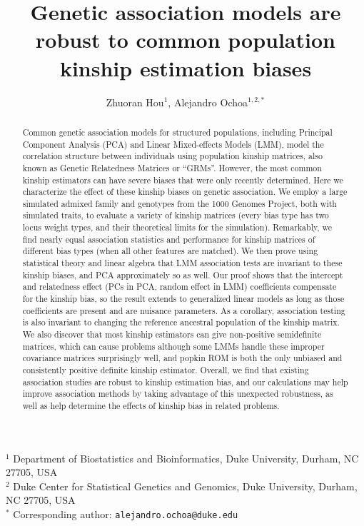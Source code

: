\documentclass[11pt]{article}
\title{\Large \textbf{Genetic association models are robust to common population kinship estimation biases}}
\author{Zhuoran Hou$^1$, Alejandro Ochoa$^{1,2,*}$}
\date{}
\begin{document}
\maketitle

\noindent
$^1$ Department of Biostatistics and Bioinformatics, Duke University, Durham, NC 27705, USA \\
$^2$ Duke Center for Statistical Genetics and Genomics, Duke University, Durham, NC 27705, USA \\
$^*$ Corresponding author: \texttt{alejandro.ochoa@duke.edu}


\begin{abstract}
  Common genetic association models for structured populations, including Principal Component Analysis (PCA) and Linear Mixed-effects Models (LMM), model the correlation structure between individuals using population kinship matrices, also known as Genetic Relatedness Matrices or ``GRMs''.
  However, the most common kinship estimators can have severe biases that were only recently determined.
  Here we characterize the effect of these kinship biases on genetic association.
  We employ a large simulated admixed family and genotypes from the 1000 Genomes Project, both with simulated traits, to evaluate a variety of kinship matrices (every bias type has two locus weight types, and their theoretical limits for the simulation).
  Remarkably, we find nearly equal association statistics and performance for kinship matrices of different bias types (when all other features are matched).
  We then prove using statistical theory and linear algebra that LMM association tests are invariant to these kinship biases, and PCA approximately so as well.
  Our proof shows that the intercept and relatedness effect (PCs in PCA, random effect in LMM) coefficients compensate for the kinship bias, so the result extends to generalized linear models as long as those coefficients are present and are nuisance parameters.
  As a corollary, association testing is also invariant to changing the reference ancestral population of the kinship matrix.
  We also discover that most kinship estimators can give non-positive semidefinite matrices, which can cause problems although some LMMs handle these improper covariance matrices surprisingly well, and popkin ROM is both the only unbiased and consistently positive definite kinship estimator.
  Overall, we find that existing association studies are robust to kinship estimation bias, and our calculations may help improve association methods by taking advantage of this unexpected robustness, as well as help determine the effects of kinship bias in related problems.
\end{abstract}
\end{document}
